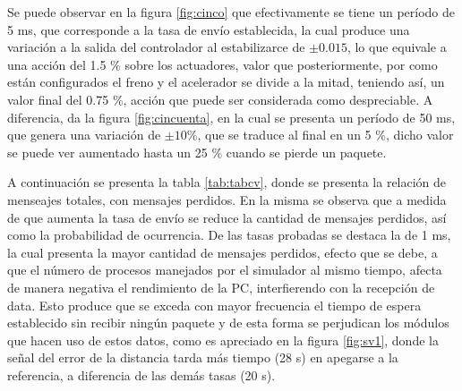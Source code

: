 \par Se puede observar en la figura \ref{fig:cinco} que efectivamente se tiene un período de 5 ms, que corresponde a la tasa de envío establecida, la cual produce una variación a la salida del controlador al estabilizarce de $ \pm 0.015$, lo que equivale a una acción del 1.5 \% sobre los actuadores, valor que posteriormente, por como están configurados el freno y el acelerador se divide a la mitad, teniendo así, un valor final del 0.75 \%, acción que puede ser considerada como despreciable. A diferencia, da la figura \ref{fig:cincuenta}, en la cual se presenta un período de 50 ms, que genera una variación de $ \pm 10 \% $, que se traduce al final en un 5 \%, dicho valor se puede ver aumentado hasta un 25 \% cuando se pierde un paquete. \\  

\par A continuación se presenta la tabla \ref{tab:tabcv}, donde se presenta la relación de menseajes totales, con mensajes perdidos. En la misma se observa que a medida de que aumenta la tasa de envío se reduce la cantidad de mensajes perdidos, así como la probabilidad de ocurrencia. De las tasas probadas se destaca la de 1 ms, la cual presenta la mayor cantidad de mensajes perdidos, efecto que se debe, a que el número de procesos manejados por el simulador al mismo tiempo, afecta de manera negativa el rendimiento de la PC, interfierendo con la recepción de data. Esto produce que se exceda con mayor frecuencia el tiempo de espera establecido sin recibir ningún paquete y de esta forma se perjudican los módulos que hacen uso de estos datos, como es apreciado en la figura \ref{fig:sv1}, donde la señal del error de la distancia tarda más tiempo (28 s) en apegarse a la referencia, a diferencia de las demás tasas (20 s). \\

\begin{table}[htbp]
  \centering
{}%
  \caption{Prueba del sistema de comunicación a distintas tasas de envío sin emplear el Visor 3D}
  \label{tab:tabsv}%
\end{table} %

